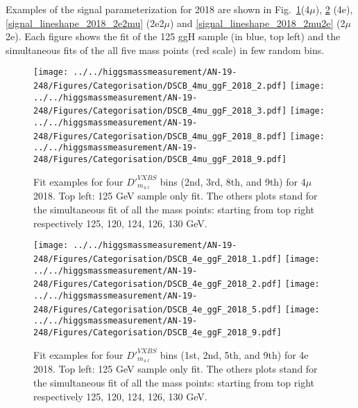 Examples of the signal parameterization for 2018 are shown in 
Fig.~\ref{signal_lineshape_2018_4mu}(4$\mu$),
 \ref{signal_lineshape_2018_4e} (4e), 
 \ref{signal_lineshape_2018_2e2mu} (2e2$\mu$) and \ref{signal_lineshape_2018_2mu2e} (2$\mu$2e). 
 Each figure shows the fit of the 125 \GeV ggH sample (in blue, top left) and
the simultaneous fits of the all five mass points (red scale) in few random bins.
\begin{figure}[!htbp]
\begin{center}
	\texttt{[image: ../../higgsmassmeasurement/AN-19-248/Figures/Categorisation/DSCB\_4mu\_ggF\_2018\_2.pdf]}
	\texttt{[image: ../../higgsmassmeasurement/AN-19-248/Figures/Categorisation/DSCB\_4mu\_ggF\_2018\_3.pdf]}
	\texttt{[image: ../../higgsmassmeasurement/AN-19-248/Figures/Categorisation/DSCB\_4mu\_ggF\_2018\_8.pdf]}
	\texttt{[image: ../../higgsmassmeasurement/AN-19-248/Figures/Categorisation/DSCB\_4mu\_ggF\_2018\_9.pdf]}
\caption{
Fit examples for four $D'^{VXBS}_{m_{4\ell}}$ bins (2nd, 3rd, 8th, and 9th) 
for 4$\mu$ 2018. Top left: 125 GeV sample only fit. The others plots stand for the simultaneous 
fit of all the mass points: starting from top right respectively 125, 120, 124, 126, 130 GeV.}
\label{signal_lineshape_2018_4mu}
\end{center}
\end{figure}

\begin{figure}[!htbp]
\begin{center}
	\texttt{[image: ../../higgsmassmeasurement/AN-19-248/Figures/Categorisation/DSCB\_4e\_ggF\_2018\_1.pdf]}
	\texttt{[image: ../../higgsmassmeasurement/AN-19-248/Figures/Categorisation/DSCB\_4e\_ggF\_2018\_2.pdf]}
	\texttt{[image: ../../higgsmassmeasurement/AN-19-248/Figures/Categorisation/DSCB\_4e\_ggF\_2018\_5.pdf]}
	\texttt{[image: ../../higgsmassmeasurement/AN-19-248/Figures/Categorisation/DSCB\_4e\_ggF\_2018\_9.pdf]}
\caption{
Fit examples for four $D'^{VXBS}_{m_{4\ell}}$ bins (1st, 2nd, 5th, and 9th) 
for 4e 2018. Top left: 125 GeV sample only fit. The others plots stand for the simultaneous 
fit of all the mass points: starting from top right respectively 125, 120, 124, 126, 130 GeV.}
\label{signal_lineshape_2018_4e}
\end{center}
\end{figure}


